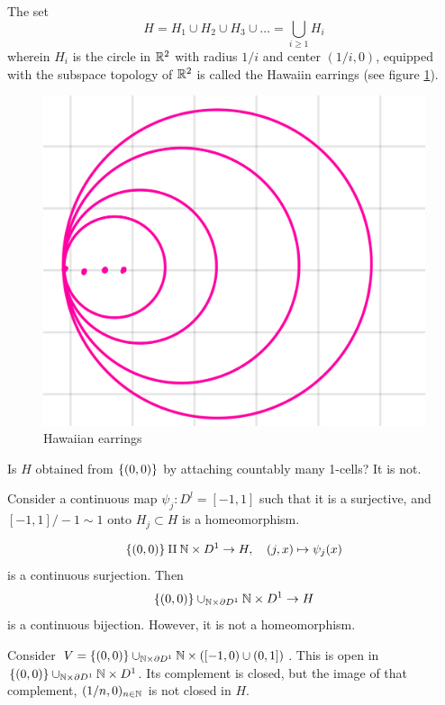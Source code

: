 \documentclass{TemplateLecture}
\begin{document}
\begin{bsp}
    The set
    \[H = H_1 \cup H_2 \cup H_3 \cup \dots = \bigcup_{i \geq 1} H_i\]
    wherein \(H_i\) is the circle in \(\mathbb{R}^2\) with radius \(1/i\) and center \((1/i, 0)\), equipped with the subspace topology of \(\mathbb{R}^2\) is called the Hawaiin earrings (see figure \ref{fig:exHw}).
    \begin{figure}
        \centering
        \includegraphics[width=0.5\linewidth]{pic/exHw.png}
        \caption{Hawaiian earrings}
        \label{fig:exHw}
    \end{figure}

    Is \(H\) obtained from \(\{(0,0)\}\) by attaching countably many 1-cells? It is not.

    Consider a continuous map \(\psi_j\colon D^l = [-1,1]\) such that it is a surjective, and \([-1,1]/-1\sim 1\) onto  \(H_j \subset H\) is a homeomorphism.

    \[\{(0,0)\} \amalg \mathbb{N} \times D^1 \to H, \quad (j,x) \mapsto \psi_j(x)\]
    is a continuous surjection. Then
    \[\{(0,0)\} \cup_{\mathbb{N}\times \partial D^1} \mathbb{N} \times D^1 \to H\]
    is a continuous bijection. However, it is not a homeomorphism.

    Consider \(V = \{(0,0)\} \cup_{\mathbb{N} \times \partial D^1} \mathbb{N} \times ([-1,0) \cup (0,1])\). This is open in \(\{(0,0)\} \cup_{\mathbb{N}\times \partial D^1} \mathbb{N} \times D^1\). Its complement is closed, but the image of that complement, \((1/n,0)_{n\in \mathbb{N}}\) is not closed in \(H\).
\end{bsp}
\end{document}
